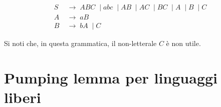 \documentclass[class=book, crop=false, oneside, 12pt]{standalone}
\begin{document}

\begin{align*}
  S\; & \to\; ABC\; \mid abc\; \mid AB\; \mid AC\; \mid BC\; \mid A\; \mid B\; \mid C \\
  A\; & \to \; aB \\
  B\; & \to\; bA\; \mid C
\end{align*}

Si noti che, in questa grammatica, il non-letterale \(C\) è non utile.

\section{Pumping lemma per linguaggi liberi}
\end{document}
